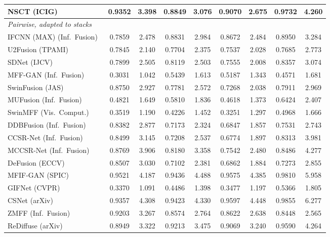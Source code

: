 \begin{table}[H]
{\begin{tabular}{lcccccccc}
NSCT (ICIG)~\cite{yang2007image} & 0.9352 & 3.398 & 0.8849 & 3.076 & 0.9070 & 2.675 & 0.9732 & 4.260 \\
\midrule
\multicolumn{9}{l}{\textit{Pairwise, adapted to stacks}} \\
IFCNN (MAX) (Inf.\ Fusion)~\cite{zhang2020ifcnn} & 0.7859 & 2.478 & 0.8831 & 2.984 & 0.8672 & 2.484 & 0.8950 & 3.284 \\
U2Fusion (TPAMI)~\cite{xu2020u2fusion} & 0.7845 & 2.140 & 0.7704 & 2.375 & 0.7537 & 2.028 & 0.7685 & 2.773 \\
SDNet (IJCV)~\cite{zhang2021sdnet} & 0.7899 & 2.505 & 0.8119 & 2.503 & 0.7555 & 2.008 & 0.8357 & 3.074 \\
MFF-GAN (Inf.\ Fusion)~\cite{zhang2021mff} & 0.3031 & 1.042 & 0.5439 & 1.613 & 0.5187 & 1.343 & 0.4571 & 1.681 \\
SwinFusion (JAS)~\cite{ma2022swinfusion} & 0.8750 & 2.927 & 0.7781 & 2.572 & 0.7268 & 2.038 & 0.7911 & 2.969 \\
MUFusion (Inf.\ Fusion)~\cite{cheng2023mufusion} & 0.4821 & 1.649 & 0.5810 & 1.836 & 0.4618 & 1.373 & 0.6424 & 2.407 \\
SwinMFF (Vis.\ Comput.)~\cite{xie2024swinmff} & 0.3519 & 1.190 & 0.4226 & 1.452 & 0.3251 & 1.297 & 0.4968 & 1.666 \\
DDBFusion (Inf.\ Fusion)~\cite{zhang2025ddbfusion} & 0.8382 & 2.877 & 0.7173 & 2.324 & 0.6847 & 1.857 & 0.7531 & 2.743 \\
CCSR-Net (Inf.\ Fusion)~\cite{ZHENG2025102974} & 0.8499 & 3.145 & 0.7208 & 2.537 & 0.6774 & 1.897 & 0.8313 & 3.981 \\
MCCSR-Net (Inf.\ Fusion)~\cite{ZHENG2025102974} & 0.8769 & 3.906 & 0.8180 & 3.358 & 0.7542 & 2.480 & 0.8486 & 4.277 \\
DeFusion (ECCV)~\cite{liang2022defusion} & 0.8507 & 3.030 & 0.7102 & 2.381 & 0.6862 & 1.884 & 0.7273 & 2.855 \\
MFIF-GAN (SPIC)~\cite{wang2021mfifgan} & 0.9521 & 4.187 & 0.9436 & 4.488 & 0.9575 & 4.385 & 0.9810 & 5.958 \\
GIFNet (CVPR)~\cite{cheng2025gifnet} & 0.3370 & 1.091 & 0.4486 & 1.398 & 0.3477 & 1.197 & 0.5366 & 1.805 \\
CSNet (arXiv)~\cite{csnet2026} & 0.9357 & 4.308 & 0.9423 & 4.330 & 0.9597 & 4.448 & 0.9855 & 6.277 \\
ZMFF (Inf.\ Fusion)~\cite{hu2023zmff} & 0.9203 & 3.267 & 0.8574 & 2.764 & 0.8622 & 2.638 & 0.8448 & 2.565 \\
ReDiffuse (arXiv)~\cite{rediffuse2026} & 0.8949 & 3.322 & 0.9213 & 3.475 & 0.9069 & 3.240 & 0.9590 & 4.264 \\

\end{tabular}}
\end{table}
